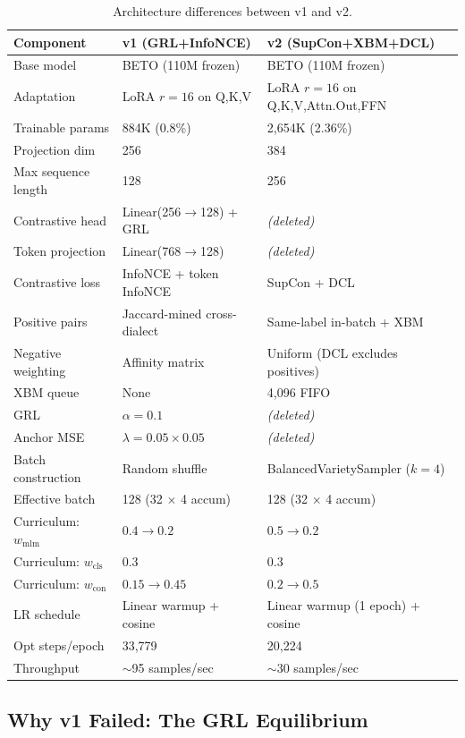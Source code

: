\documentclass[11pt,a4paper]{article}
\begin{document}
\begin{table}[H]
\centering
\caption{Architecture differences between v1 and v2.}
\label{tab:arch}
\small
\begin{tabular}{@{}lll@{}}
\toprule
\textbf{Component} & \textbf{v1 (GRL+InfoNCE)} & \textbf{v2 (SupCon+XBM+DCL)} \\
\midrule
Base model & BETO (110M frozen) & BETO (110M frozen) \\
Adaptation & LoRA $r\!=\!16$ on Q,K,V & LoRA $r\!=\!16$ on Q,K,V,Attn.Out,FFN \\
Trainable params & 884K (0.8\%) & 2{,}654K (2.36\%) \\
Projection dim & 256 & 384 \\
Max sequence length & 128 & 256 \\
Contrastive head & Linear(256$\to$128) + GRL & \emph{(deleted)} \\
Token projection & Linear(768$\to$128) & \emph{(deleted)} \\
Contrastive loss & InfoNCE + token InfoNCE & SupCon + DCL \\
Positive pairs & Jaccard-mined cross-dialect & Same-label in-batch + XBM \\
Negative weighting & Affinity matrix & Uniform (DCL excludes positives) \\
XBM queue & None & 4{,}096 FIFO \\
GRL & $\alpha = 0.1$ & \emph{(deleted)} \\
Anchor MSE & $\lambda = 0.05 \times 0.05$ & \emph{(deleted)} \\
Batch construction & Random shuffle & BalancedVarietySampler ($k\!=\!4$) \\
Effective batch & 128 (32 $\times$ 4 accum) & 128 (32 $\times$ 4 accum) \\
Curriculum: $w_{\text{mlm}}$ & $0.4 \to 0.2$ & $0.5 \to 0.2$ \\
Curriculum: $w_{\text{cls}}$ & $0.3$ & $0.3$ \\
Curriculum: $w_{\text{con}}$ & $0.15 \to 0.45$ & $0.2 \to 0.5$ \\
LR schedule & Linear warmup + cosine & Linear warmup (1 epoch) + cosine \\
Opt steps/epoch & 33{,}779 & 20{,}224 \\
Throughput & $\sim$95 samples/sec & $\sim$30 samples/sec \\
\bottomrule
\end{tabular}
\end{table}

\subsection{Why v1 Failed: The GRL Equilibrium}
\end{document}
